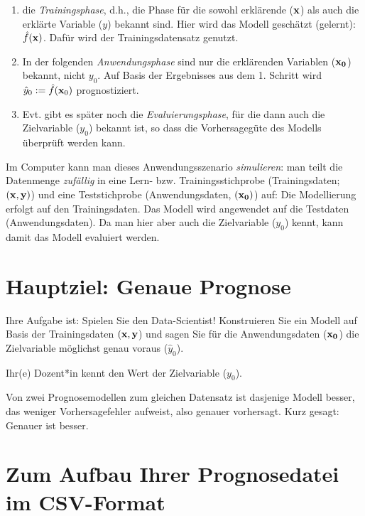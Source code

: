 \documentclass[
]{book}
\begin{document}
\begin{enumerate}
\def\labelenumi{\arabic{enumi}.}
\item
  die \emph{Trainingsphase}, d.h., die Phase für die sowohl erklärende (\({\bf{x}}\)) als auch die erklärte Variable (\(y\)) bekannt sind. Hier wird das Modell geschätzt (gelernt): \(\hat{f}(\bf{x})\). Dafür wird der Trainingsdatensatz genutzt.
\item
  In der folgenden \emph{Anwendungsphase} sind nur die erklärenden Variablen (\({\bf{x_0}}\)) bekannt, nicht \(y_0\). Auf Basis der Ergebnisses aus dem 1. Schritt wird \(\hat{y}_0 :=\hat{f}({\bf{x}}_0)\) prognostiziert.
\item
  Evt. gibt es später noch die \emph{Evaluierungsphase}, für die dann auch die Zielvariable (\(y_0\)) bekannt ist, so dass die Vorhersagegüte des Modells überprüft werden kann.
\end{enumerate}

Im Computer kann man dieses Anwendungsszenario \emph{simulieren}:
man teilt die Datenmenge \emph{zufällig} in eine Lern- bzw. Trainingsstichprobe (Trainingsdaten; \((\bf{x},y)\)) und eine Teststichprobe (Anwendungsdaten, \((\bf{x_0})\)) auf:
Die Modellierung erfolgt auf den Trainingsdaten.
Das Modell wird angewendet auf die Testdaten (Anwendungsdaten).
Da man hier aber auch die Zielvariable (\(y_0\)) kennt, kann damit das Modell evaluiert werden.

\hypertarget{hauptziel-genaue-prognose}{%
\section{Hauptziel: Genaue Prognose}\label{hauptziel-genaue-prognose}}

Ihre Aufgabe ist: Spielen Sie den Data-Scientist!
Konstruieren Sie ein Modell auf Basis der Trainingsdaten \((\bf{x},y\))
und sagen Sie für die Anwendungsdaten (\(\bf{x_0}\)) die Zielvariable möglichst genau voraus (\(\hat{y}_0\)).

Ihr(e) Dozent*in kennt den Wert der Zielvariable (\(y_0\)).

Von zwei Prognosemodellen zum gleichen Datensatz ist dasjenige Modell besser,
das weniger Vorhersagefehler aufweist, also genauer vorhersagt.
Kurz gesagt: Genauer ist besser.

\hypertarget{zum-aufbau-ihrer-prognosedatei-im-csv-format}{%
\section{Zum Aufbau Ihrer Prognosedatei im CSV-Format}\label{zum-aufbau-ihrer-prognosedatei-im-csv-format}}
\end{document}
